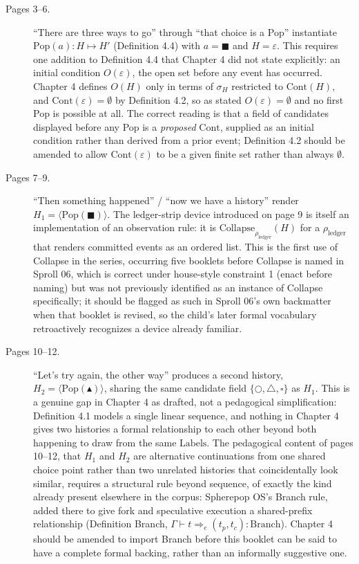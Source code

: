 \documentclass[11pt,twoside]{book}
\begin{document}
\begin{description}
\item[Pages 3--6.] ``There are three ways to go'' through ``that choice is a Pop'' instantiate $\mathrm{Pop}(a) : H \mapsto H'$ (Definition 4.4) with $a = \blacksquare$ and $H = \varepsilon$. This requires one addition to Definition 4.4 that Chapter 4 did not state explicitly: an initial condition $O(\varepsilon)$, the open set before any event has occurred. Chapter 4 defines $O(H)$ only in terms of $\sigma_H$ restricted to $\mathrm{Cont}(H)$, and $\mathrm{Cont}(\varepsilon) = \emptyset$ by Definition 4.2, so as stated $O(\varepsilon) = \emptyset$ and no first Pop is possible at all. The correct reading is that a field of candidates displayed before any Pop is a \emph{proposed} $\mathrm{Cont}$, supplied as an initial condition rather than derived from a prior event; Definition 4.2 should be amended to allow $\mathrm{Cont}(\varepsilon)$ to be a given finite set rather than always $\emptyset$.
\item[Pages 7--9.] ``Then something happened'' / ``now we have a history'' render $H_1 = \langle \mathrm{Pop}(\blacksquare) \rangle$. The ledger-strip device introduced on page 9 is itself an implementation of an observation rule: it is $\mathrm{Collapse}_{\rho_{\mathrm{ledger}}}(H)$ for a $\rho_{\mathrm{ledger}}$ that renders committed events as an ordered list. This is the first use of Collapse in the series, occurring five booklets before Collapse is named in Sproll 06, which is correct under house-style constraint 1 (enact before naming) but was not previously identified as an instance of Collapse specifically; it should be flagged as such in Sproll 06's own backmatter when that booklet is revised, so the child's later formal vocabulary retroactively recognizes a device already familiar.
\item[Pages 10--12.] ``Let's try again, the other way'' produces a second history, $H_2 = \langle \mathrm{Pop}(\blacktriangle) \rangle$, sharing the same candidate field $\{\bigcirc, \triangle, \square\}$ as $H_1$. This is a genuine gap in Chapter 4 as drafted, not a pedagogical simplification: Definition 4.1 models a single linear sequence, and nothing in Chapter 4 gives two histories a formal relationship to each other beyond both happening to draw from the same $\mathrm{Labels}$. The pedagogical content of pages 10--12, that $H_1$ and $H_2$ are alternative continuations from one shared choice point rather than two unrelated histories that coincidentally look similar, requires a structural rule beyond sequence, of exactly the kind already present elsewhere in the corpus: Spherepop OS's Branch rule, added there to give fork and speculative execution a shared-prefix relationship (Definition Branch, $\Gamma \vdash t \Rightarrow_e (t_p, t_c) : \mathrm{Branch}$). Chapter 4 should be amended to import Branch before this booklet can be said to have a complete formal backing, rather than an informally suggestive one.

\end{description}
\end{document}
